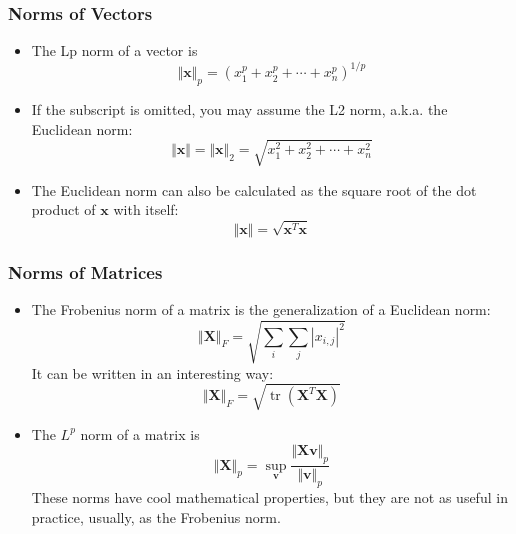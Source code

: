 \documentclass{beamer}
\DeclareMathOperator{\tr}{tr}
\begin{document}
\begin{frame}
  \frametitle{Norms of Vectors}
  \begin{itemize}
  \item The Lp norm of a vector is
    \begin{displaymath}
      \Vert\mathbf{x}\Vert_p=\left(x_1^p+x_2^p+\cdots+x_n^p\right)^{1/p}
    \end{displaymath}
  \item If the subscript is omitted, you may assume the L2 norm,
    a.k.a. the Euclidean norm:
    \begin{displaymath}
      \Vert\mathbf{x}\Vert
      =\Vert\mathbf{x}\Vert_2
      =\sqrt{x_1^2+x_2^2+\cdots+x_n^2}
    \end{displaymath}
  \item The Euclidean norm can also be calculated as the square root of the dot product
    of $\mathbf{x}$ with itself:
    \begin{displaymath}
      \Vert\mathbf{x}\Vert = \sqrt{\mathbf{x}^T\mathbf{x}}
    \end{displaymath}
  \end{itemize}
\end{frame}

\begin{frame}
  \frametitle{Norms of Matrices}
  \begin{itemize}
  \item The Frobenius norm of a matrix is the generalization of a Euclidean norm:
    \begin{displaymath}
      \Vert\mathbf{X}\Vert_F
      =\sqrt{\sum_i\sum_j |x_{i,j}|^2}
    \end{displaymath}
    It can be written in an interesting way:
    \begin{displaymath}
      \Vert\mathbf{X}\Vert_F=
      \sqrt{\tr(\mathbf{X}^T\mathbf{X})}
    \end{displaymath}
  \item The $L^p$ norm of a matrix is
    \begin{displaymath}
      \Vert\mathbf{X}\Vert_p=
      \sup_{\mathbf{v}}\frac{\Vert\mathbf{X}\mathbf{v}\Vert_p}{\Vert\mathbf{v}\Vert_p}
    \end{displaymath}
    These norms have cool mathematical properties, but they are not as
    useful in practice, usually, as the Frobenius norm.
  \end{itemize}
\end{frame}

\end{document}
